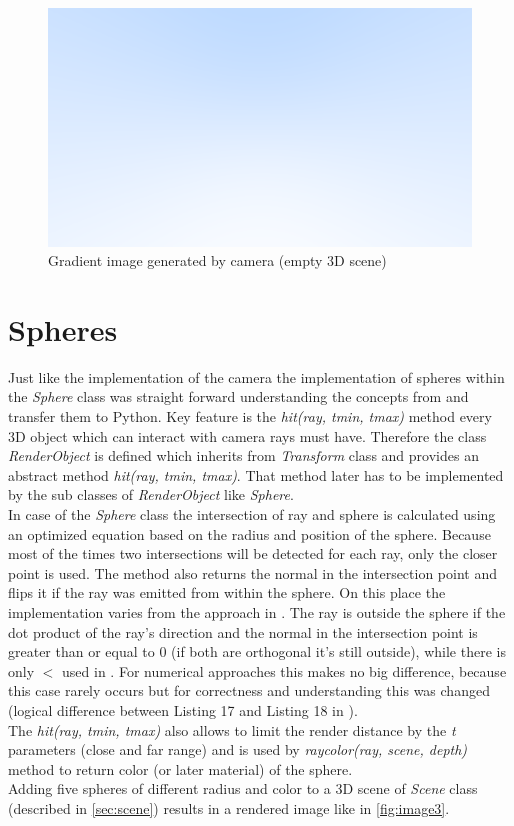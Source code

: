 \documentclass[]{article}
\begin{document}
	\begin{figure}[h]
		\centering
		\includegraphics[width=0.9\linewidth]{image2}
		\caption{Gradient image generated by camera (empty 3D scene)}
		\label{fig:image2}
	\end{figure}

	\section{Spheres}
	Just like the implementation of the camera the implementation of spheres within the \emph{Sphere} class was straight forward understanding the concepts from \cite{Shirley2020RTW1} and transfer them to Python. Key feature is the \emph{hit(ray, t\textunderscore min, t\textunderscore max)} method every 3D object which can interact with camera rays must have. Therefore the class \emph{RenderObject} is defined which inherits from \emph{Transform} class and provides an abstract method \emph{hit(ray, t\textunderscore min, t\textunderscore max)}. That method later has to be implemented by the sub classes of \emph{RenderObject} like \emph{Sphere}.
	\\
	In case of the \emph{Sphere} class the intersection of ray and sphere is calculated using an optimized equation based on the radius and position of the sphere. Because most of the times two intersections will be detected for each ray, only the closer point is used. The method also returns the normal in the intersection point and flips it if the ray was emitted from within the sphere. On this place the implementation varies from the approach in \cite{Shirley2020RTW1}. The ray is outside the sphere if the dot product of the ray’s direction and the normal in the intersection point is greater than or equal to 0 (if both are orthogonal it’s still outside), while there is only $<$ used in \cite{Shirley2020RTW1}. For numerical approaches this makes no big difference, because this case rarely occurs but for correctness and understanding this was changed (logical difference between Listing 17 and Listing 18 in \cite{Shirley2020RTW1}).
	\\
	The \emph{hit(ray, t\textunderscore min, t\textunderscore max)} also allows to limit the render distance by the \emph{t} parameters (close and far range) and is used by \emph{ray\textunderscore color(ray, scene, depth)} method to return color (or later material) of the sphere.
	\\
	Adding five spheres of different radius and color to a 3D scene of \emph{Scene} class (described in \cref{sec:scene}) results in a rendered image like in \cref{fig:image3}.
	
\end{document}
